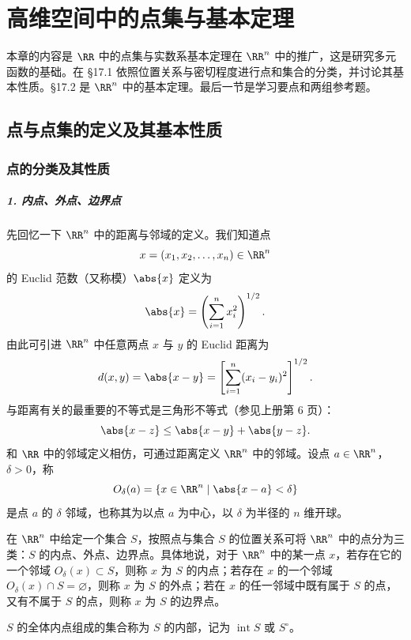 \chapter{高维空间中的点集与基本定理}


本章的内容是 $\RR$ 中的点集与实数系基本定理在 $\RR^n$ 中的推广，这是研究多元函数的基础。在 §17.1 依照位置关系与密切程度进行点和集合的分类，并讨论其基本性质。§17.2 是 $\RR^n$ 中的基本定理。最后一节是学习要点和两组参考题。

\section{点与点集的定义及其基本性质}

\subsection{点的分类及其性质}

\paragraph{1. 内点、外点、边界点}
先回忆一下 $\RR^n$ 中的距离与邻域的定义。我们知道点
\[
  x=(x_1,x_2,\ldots,x_n)\in\RR^n
\]
的 Euclid 范数（又称模）$\abs{x}$ 定义为
\[
  \abs{x}=\left(\sum_{i=1}^n x_i^2\right)^{1/2}.
\]
由此可引进 $\RR^n$ 中任意两点 $x$ 与 $y$ 的 Euclid 距离为
\[
  d(x,y)=\abs{x-y}
  =\left[\sum_{i=1}^n(x_i-y_i)^2\right]^{1/2}.
\]
与距离有关的最重要的不等式是三角形不等式（参见上册第 6 页）：
\[
  \abs{x-z}\leq \abs{x-y}+\abs{y-z}.
\]
和 $\RR$ 中的邻域定义相仿，可通过距离定义 $\RR^n$ 中的邻域。设点 $a\in\RR^n$，$\delta>0$，称
\[
  O_\delta(a)=\{x\in\RR^n\mid \abs{x-a}<\delta\}
\]
是点 $a$ 的 $\delta$ 邻域，也称其为以点 $a$ 为中心，以 $\delta$ 为半径的 $n$ 维开球。

在 $\RR^n$ 中给定一个集合 $S$，按照点与集合 $S$ 的位置关系可将 $\RR^n$ 中的点分为三类：$S$ 的内点、外点、边界点。具体地说，对于 $\RR^n$ 中的某一点 $x$，若存在它的一个邻域 $O_\delta(x)\subset S$，则称 $x$ 为 $S$ 的内点；若存在 $x$ 的一个邻域 $O_\delta(x)\cap S=\varnothing$，则称 $x$ 为 $S$ 的外点；若在 $x$ 的任一邻域中既有属于 $S$ 的点，又有不属于 $S$ 的点，则称 $x$ 为 $S$ 的边界点。

$S$ 的全体内点组成的集合称为 $S$ 的内部，记为 $\operatorname{int}S$ 或 $S^\circ$。

